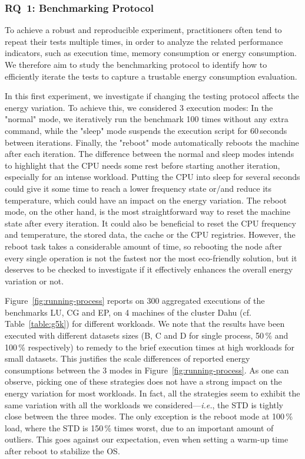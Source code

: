 \subsubsection{\textsc{RQ}~1: Benchmarking Protocol}
To achieve a robust and reproducible experiment, practitioners often tend to repeat their tests multiple times, in order to analyze the related performance indicators, such as execution time, memory consumption or energy consumption.
We therefore aim to study the benchmarking protocol to identify how to efficiently iterate the tests to capture a trustable energy consumption evaluation.

In this first experiment, we investigate if changing the testing protocol affects the energy variation.
To achieve this, we considered 3 execution modes:
In the \textsf{"normal"} mode, we iteratively run the benchmark 100 times without any extra command, while the \textsf{"sleep"} mode suspends the execution script for 60\,seconds between iterations.
Finally, the \textsf{"reboot"} mode automatically reboots the machine after each iteration.
The difference between the \textsf{normal} and \textsf{sleep} modes intends to highlight that the CPU needs some rest before starting another iteration, especially for an intense workload.
Putting the CPU into sleep for several seconds could give it some time to reach a lower frequency state or/and reduce its temperature, which could have an impact on the energy variation.
The \textsf{reboot} mode, on the other hand, is the most straightforward way to reset the machine state after every iteration.
It could also be beneficial to reset the CPU frequency and temperature, the stored data, the cache or the CPU registries.
However, the reboot task takes a considerable amount of time, so rebooting the node after every single operation is not the fastest nor the most eco-friendly solution, but it deserves to be checked to investigate if it effectively enhances the overall energy variation or not.

Figure~\ref{fig:running-process} reports on $300$ aggregated executions of the  benchmarks \textsf{LU}, \textsf{CG} and \textsf{EP}, on 4 machines of the cluster \textsf{Dahu} (cf. Table~\ref{table:g5k}) for different workloads.
We note that the results have been executed with different datasets sizes (\textsf{B}, \textsf{C} and \textsf{D} for single process, 50\,\% and 100\,\% respectively) to remedy to the brief execution times at high workloads for small datasets.
This justifies the scale differences of reported energy consumptions between the 3 modes in Figure~\ref{fig:running-process}.
As one can observe, picking one of these strategies does not have a strong impact on the energy variation for most workloads.
In fact, all the strategies seem to exhibit the same variation with all the workloads we considered---\emph{i.e.}, the STD is tightly close between the three modes.
The only exception is the \textsf{reboot} mode at 100\,\% load, where the STD is 150\,\% times worst, due to an important amount of outliers.
This goes against our expectation, even when setting a warm-up time after reboot to stabilize the OS.

